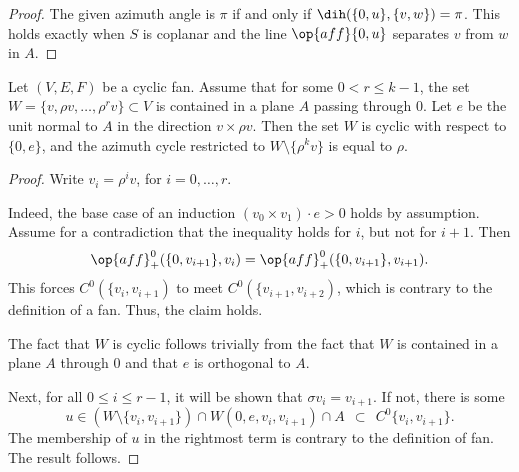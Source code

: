 \begin{proof}  The given azimuth angle is $\pi$ if and only if $\dih(\{0,u\},\{v,w\})=\pi$.  This holds
exactly when $S$ is coplanar and the line $\op{aff}\{0,u\}$ separates $v$ from $w$ in $A$.
\end{proof}

\begin{lemma}
Let $(V,E,F)$ be a cyclic fan.  Assume that for some $0<r\le k-1$, the set $W=\{v,\rho v,\ldots,\rho^r v\}\subset V$ is contained in a plane $A$ passing through $0$.  Let $e$ be the unit normal to $A$ in the direction $v\times \rho v$.  Then 
the set $W$ is cyclic with respect to $\{0,e\}$, and the azimuth cycle restricted to $W\setminus \{\rho^k v\}$ is equal to $\rho$.
\end{lemma}

\begin{proof} 
Write $v_i = \rho^i v$, for $i=0,\ldots,r$.

Indeed, the base case of an induction  $(v_0\times v_1)\cdot e > 0$ holds by assumption.    
Assume for a contradiction that the inequality holds for $i$, but not for $i+1$.
Then 
$$\op{aff}^0_+(\{0,v_{i+1}\},v_i) = \op{aff}^0_+(\{0,v_{i+1}\},v_{i+1}).$$ 
This forces $C^0(\{v_i,v_{i+1})$ to meet $C^0(\{v_{i+1},v_{i+2})$, which
is contrary to the definition of a fan.  Thus, the claim holds.

The fact that $W$ is cyclic follows trivially from the fact that $W$ is contained in a plane $A$ through $0$ and that $e$ is orthogonal to $A$.

Next, for all $0\le i \le r-1$, it will be shown that $\sigma v_i = v_{i+1}$.
If not, there is some 
$$u \in (W\setminus \{v_i,v_{i+1}\}) \cap W(0,e,v_i,v_{i+1}) \cap A
  ~~\subset~~ C^0\{v_i,v_{i+1}\}.
$$
The membership of $u$ in the rightmost term is contrary to the definition of fan.  The result follows.
\end{proof}

